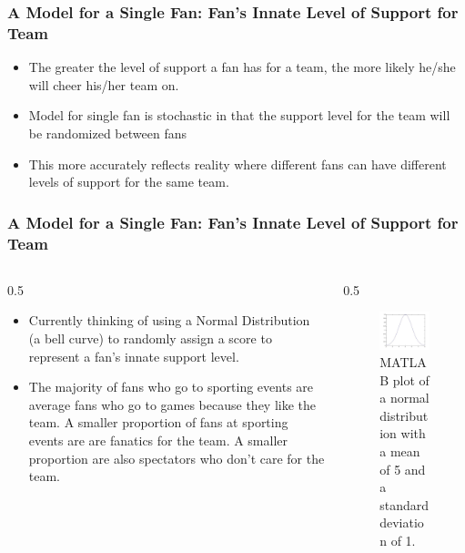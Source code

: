 \documentclass[compress,handout,10pt]{beamer}
\let\olditem\item
\renewcommand{\item}{\setlength{\itemsep}{0.5\baselineskip}\olditem}
\begin{document}
\begin {frame}
	\frametitle{A Model for a Single Fan: Fan's Innate Level of Support for Team}
	\begin{itemize}
		\item The greater the level of support a fan has for a team, the more likely he/she will cheer his/her team on.
		\item Model for single fan is stochastic in that the support level for the team will be randomized between fans
		\item This more accurately reflects reality where different fans can have different levels of support for the same team.
	\end{itemize}
\end {frame}

\begin{frame}
	\frametitle{A Model for a Single Fan: Fan's Innate Level of Support for Team}
	\begin {columns}
		\begin {column} {0.5\textwidth}
			\begin{itemize}
				\item Currently thinking of using a Normal Distribution (a bell curve) to randomly assign a score to represent a fan's innate support level.
				\item The majority of fans who go to sporting events are average fans who go to games because they like the team. A smaller proportion of fans at sporting events are are fanatics for the team. A smaller proportion are also spectators who don't care for the team.
			\end{itemize}
		\end {column}
		\begin {column} {0.5\textwidth}
		\begin{figure}
		\begin{center}
			\includegraphics [width=2in] {NormDistribution.jpg}
			\caption{{\tiny MATLAB plot of a normal distribution with a mean of 5 and a standard deviation of 1.}}
		\end{center}
		\end{figure}
		\end {column}
	\end {columns}	
\end{frame}
\end{document}
